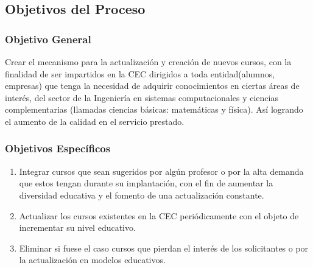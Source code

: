 
\subsection{Objetivos del Proceso} 	%

\subsubsection{Objetivo General}	%
		Crear el mecanismo para la actualización y creación de nuevos cursos, con la finalidad de ser impartidos en la CEC dirigidos a toda entidad(alumnos, empresas) que tenga la necesidad de adquirir conocimientos en ciertas áreas de interés, del sector de la Ingeniería en sistemas computacionales y ciencias complementarias (llamadas ciencias básicas: matemáticas y física). Así logrando el aumento de la calidad en el servicio prestado.
\subsubsection{Objetivos Específicos}	%
\begin{enumerate}[I] 			%
	\item Integrar cursos que sean sugeridos por algún profesor o por la alta demanda que estos tengan durante su implantación, con el fin de aumentar la diversidad educativa y el fomento de una actualización constante.
	\item Actualizar los cursos existentes en la CEC periódicamente con el objeto de incrementar su nivel educativo.
	\item Eliminar si fuese el caso cursos que pierdan el interés de los solicitantes o por la actualización en modelos educativos.
\end{enumerate}

